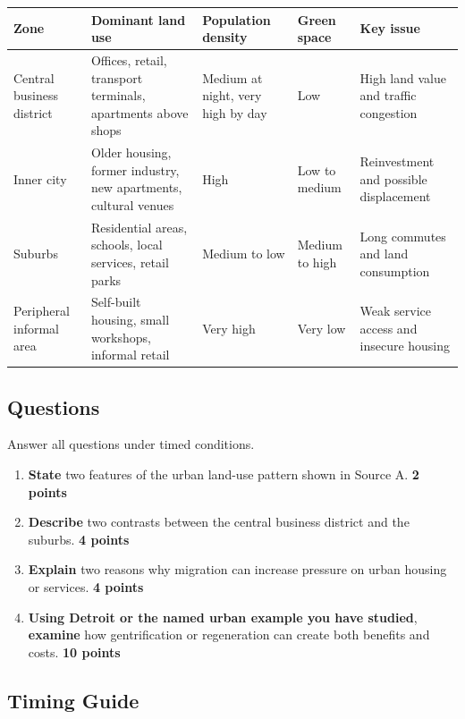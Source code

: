 \documentclass[11pt,a4paper]{article}
\newcommand{\exam}[1]{\textcolor{AccentTeal}{\textbf{#1}}}
\begin{document}
\begin{tabularx}{\textwidth}{L{0.19\textwidth}Y Y Y Y}
\toprule
\textbf{Zone} & \textbf{Dominant land use} & \textbf{Population density} &
\textbf{Green space} & \textbf{Key issue} \\
\midrule
Central business district & Offices, retail, transport terminals, apartments
above shops & Medium at night, very high by day & Low & High land value and
traffic congestion \\
Inner city & Older housing, former industry, new apartments, cultural venues &
High & Low to medium & Reinvestment and possible displacement \\
Suburbs & Residential areas, schools, local services, retail parks & Medium to
low & Medium to high & Long commutes and land consumption \\
Peripheral informal area & Self-built housing, small workshops, informal retail
& Very high & Very low & Weak service access and insecure housing \\
\bottomrule
\end{tabularx}

\subsection{Questions}

Answer all questions under timed conditions.

\begin{enumerate}
  \item \exam{State} two features of the urban land-use pattern shown in Source
  A. \hfill \textbf{2 points}
  \item \exam{Describe} two contrasts between the central business district and
  the suburbs. \hfill \textbf{4 points}
  \item \exam{Explain} two reasons why migration can increase pressure on urban
  housing or services. \hfill \textbf{4 points}
  \item \exam{Using Detroit or the named urban example you have studied},
  \exam{examine} how gentrification or regeneration can create both benefits
  and costs. \hfill \textbf{10 points}
\end{enumerate}

\subsection{Timing Guide}
\end{document}
